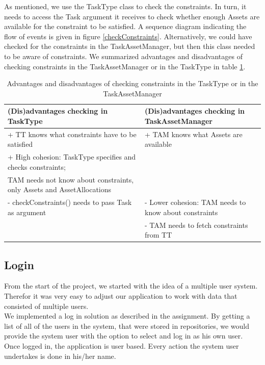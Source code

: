 			As mentioned, we use the TaskType class to check the constraints. In turn, it needs to access the Task argument it receives to check whether enough Assets are available for the constraint to be satisfied. A sequence diagram indicating the flow of events is given in figure \ref{checkConstraints}. Alternatively, we could have checked for the constraints in the TaskAssetManager, but then this class needed to be aware of constraints. We summarized advantages and disadvantages of checking constraints in the TaskAssetManager or in the TaskType in table \ref{TaskType Tam}.
						
			\begin{table}
			\begin{tabular}{|p{7cm}|p{5cm}|}
				\hline
				(Dis)advantages checking in TaskType & (Dis)advantages checking in TaskAssetManager\\
				\hline
				
				+ TT knows what constraints have to be satisfied & + TAM knows what Assets are available\\
				+ High cohesion: TaskType specifies and checks constraints;&\\ 
					TAM needs not know about constraints, only Assets and AssetAllocations& \\
				\hline
				- checkConstraints() needs to pass Task as argument & - Lower cohesion: TAM needs to know about constraints\\
				& - TAM needs to fetch constraints from TT\\
				\hline
			\end{tabular}
			\caption{Advantages and disadvantages of checking constraints in the TaskType or in the TaskAssetManager}
						\label{TaskType Tam}
			\end{table}
			

			
		
		
		\subsection{Login}
			From the start of the project, we started with the idea of a multiple user system. Therefor it was very easy to adjust our application to work with data that consisted of multiple users.\\
			We implemented a log in solution as described in the assignment. By getting a list of all of the users in the system, that were stored in repositories, we would provide the system user with the option to select and log in as his own user.\\
			Once logged in, the application is user based. Every action the system user undertakes is done in his/her name.
